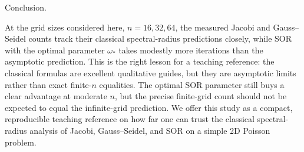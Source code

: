 \documentclass[11pt]{article}
\begin{document}
Conclusion.

At the grid sizes considered here, \(n = 16, 32, 64\), the measured Jacobi and Gauss--Seidel counts track their classical spectral-radius predictions closely, while SOR with the optimal parameter \(\omega_*\) takes modestly more iterations than the asymptotic prediction. This is the right lesson for a teaching reference: the classical formulas are excellent qualitative guides, but they are asymptotic limits rather than exact finite-\(n\) equalities. The optimal SOR parameter still buys a clear advantage at moderate \(n\), but the precise finite-grid count should not be expected to equal the infinite-grid prediction. We offer this study as a compact, reproducible teaching reference on how far one can trust the classical spectral-radius analysis of Jacobi, Gauss--Seidel, and SOR on a simple 2D Poisson problem.
\printbibliography[title={References}]
\end{document}
